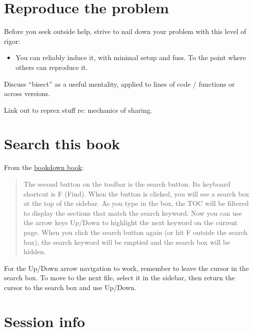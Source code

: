 \documentclass[
  letterpaper,
]{book}
\providecommand{\tightlist}{%
  \setlength{\itemsep}{0pt}\setlength{\parskip}{0pt}}\usepackage{longtable,booktabs,array}
\begin{document}
\hypertarget{reproduce-the-problem}{%
\chapter{Reproduce the problem}\label{reproduce-the-problem}}

Before you seek outside help, strive to nail down your problem with this
level of rigor:

\begin{itemize}
\tightlist
\item
  You can reliably induce it, with minimal setup and fuss. To the point
  where others can reproduce it.
\end{itemize}

Discuss ``bisect'' as a useful mentality, applied to lines of code /
functions or across versions.

Link out to reprex stuff re: mechanics of sharing.


\hypertarget{search}{%
\chapter{Search this book}\label{search}}

From the \href{https://bookdown.org/yihui/bookdown/html.html}{bookdown
book}:

\begin{quote}
The second button on the toolbar is the search button. Its keyboard
shortcut is F (Find). When the button is clicked, you will see a search
box at the top of the sidebar. As you type in the box, the TOC will be
filtered to display the sections that match the search keyword. Now you
can use the arrow keys Up/Down to highlight the next keyword on the
current page. When you click the search button again (or hit F outside
the search box), the search keyword will be emptied and the search box
will be hidden.
\end{quote}

For the Up/Down arrow navigation to work, remember to leave the cursor
in the search box. To move to the next file, select it in the sidebar,
then return the cursor to the search box and use Up/Down.


\hypertarget{session-info}{%
\chapter*{Session info}\label{session-info}}
\end{document}

